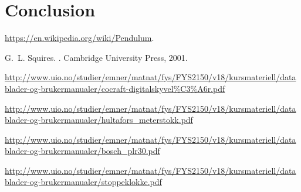 \documentclass[11pt,a4paper]{article}
\begin{document}
\section{\label{sec:conc}Conclusion}


\begin{thebibliography}{1}

\url{https://en.wikipedia.org/wiki/Pendulum}.

G.~L. Squires.
.
\newblock Cambridge University Press, 2001.

\url{http://www.uio.no/studier/emner/matnat/fys/FYS2150/v18/kursmateriell/datablader-og-brukermanualer/cocraft-digitalskyvel%C3%A6r.pdf}

\url{http://www.uio.no/studier/emner/matnat/fys/FYS2150/v18/kursmateriell/datablader-og-brukermanualer/hultafors_meterstokk.pdf}

\url{http://www.uio.no/studier/emner/matnat/fys/FYS2150/v18/kursmateriell/datablader-og-brukermanualer/bosch_plr30.pdf}

\url{http://www.uio.no/studier/emner/matnat/fys/FYS2150/v18/kursmateriell/datablader-og-brukermanualer/stoppeklokke.pdf}

\end{thebibliography}
\end{document}
